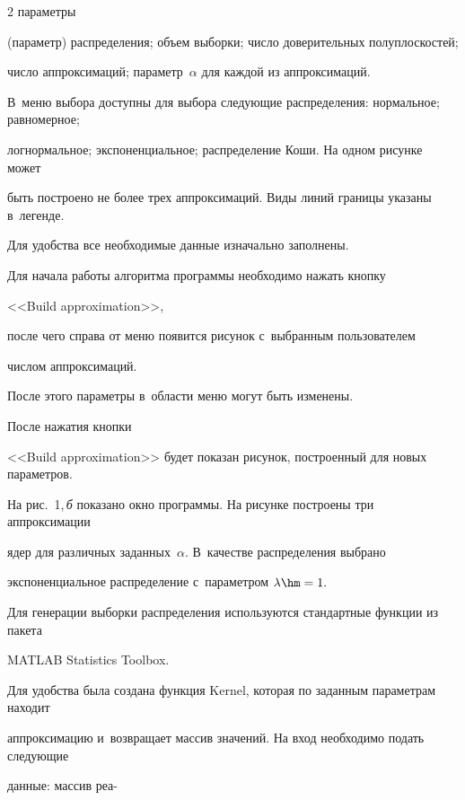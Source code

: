 \begin{multicols}{2}
па\-ра\-мет\-ры 

(па\-ра\-метр) распределения; объем выборки; чис\-ло доверительных полуплоскостей; 

чис\-ло аппроксимаций; па\-ра\-метр~$\alpha$ для каждой из аппроксимаций. 

В~меню выбора доступны для выбора сле\-ду\-ющие распределения: нормальное; равномерное; 

логнормальное; экспоненциальное; распределение Коши. На одном рисунке может 

быть по\-стро\-ено не более трех аппроксимаций. Виды линий границы указаны в~легенде.

Для удоб\-ст\-ва все необходимые данные изначально заполнены.

Для начала работы алгоритма программы необходимо нажать кнопку 

<<Build approximation>>,

после чего справа от меню появится рисунок с~выбранным пользователем 

чис\-лом аппроксимаций.

После этого па\-ра\-мет\-ры в~об\-ласти меню могут быть изменены.

После нажатия кноп\-ки 

<<Build approximation>> будет показан рисунок, по\-стро\-ен\-ный для новых па\-ра\-мет\-ров.



На рис.~1,\,\textit{б} показано окно программы. На рисунке построены три аппроксимации 

ядер для различных заданных~$\alpha$. В~качестве распределения выбрано 

экспоненциальное рас\-пре\-де\-ле\-ние с~па\-ра\-мет\-ром $\lambda\hm=1.$





Для  генерации выборки распределения используются стандартные функции  из пакета 

MATLAB Statistics Toolbox.



Для удобства была создана функция Kernel, которая по заданным па\-ра\-мет\-рам находит  

аппроксимацию и~возвращает мас\-сив значений. На вход необходимо подать сле\-ду\-ющие 

данные: массив реа-\linebreak\vspace*{-12pt}




\end{multicols}
